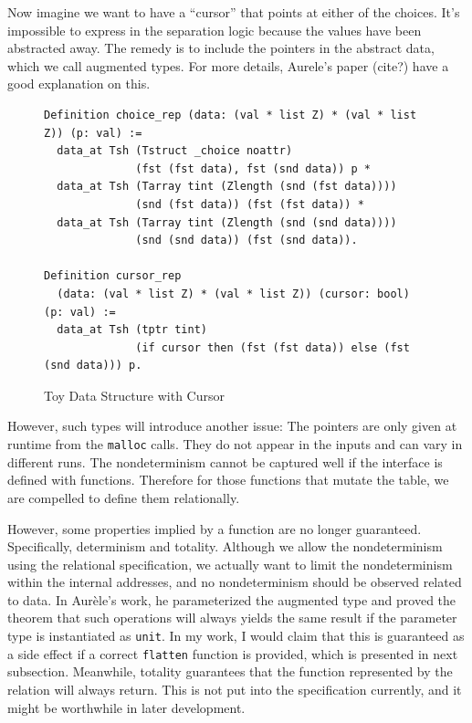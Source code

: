 \documentclass[runningheads]{llncs}
\begin{document}
Now imagine we want to have a ``cursor'' that points at either of the choices.
It's impossible to express in the separation logic because the values have
been abstracted away. The remedy is to include the pointers in the abstract
data, which we call augmented types. For more details, Aurele's paper (cite?)
have a good explanation on this.

\begin{figure}[htbp]
  \centering
\begin{verbatim}
Definition choice_rep (data: (val * list Z) * (val * list Z)) (p: val) :=
  data_at Tsh (Tstruct _choice noattr)
              (fst (fst data), fst (snd data)) p *
  data_at Tsh (Tarray tint (Zlength (snd (fst data))))
              (snd (fst data)) (fst (fst data)) *
  data_at Tsh (Tarray tint (Zlength (snd (snd data))))
              (snd (snd data)) (fst (snd data)).

Definition cursor_rep
  (data: (val * list Z) * (val * list Z)) (cursor: bool) (p: val) :=
  data_at Tsh (tptr tint)
              (if cursor then (fst (fst data)) else (fst (snd data))) p.
\end{verbatim}
  \caption{Toy Data Structure with Cursor}\label{fig:choice_cursor}
\end{figure}

However, such types will introduce another issue: The pointers are only given at
runtime from the \texttt{malloc} calls. They do not appear in the inputs and can
vary in different runs. The nondeterminism cannot be captured well if the
interface is defined with functions. Therefore for those functions that mutate
the table, we are compelled to define them relationally. 

However, some properties implied by a function are no longer guaranteed.
Specifically, determinism and totality. Although we allow the nondeterminism
using the relational specification, we actually want to limit the nondeterminism
within the internal addresses, and no nondeterminism should be observed related
to data. In Aur\`ele's work, he parameterized the augmented type and proved the
theorem that such operations will always yields the same result if the
parameter type is instantiated as \texttt{unit}. In my work, I would claim 
that this is guaranteed as a side effect if a correct \texttt{flatten} function
is provided, which is presented in next subsection. Meanwhile, totality
guarantees that the function represented by the relation will always return.
This is not put into the specification currently, and it might be worthwhile in
later development.
\end{document}
